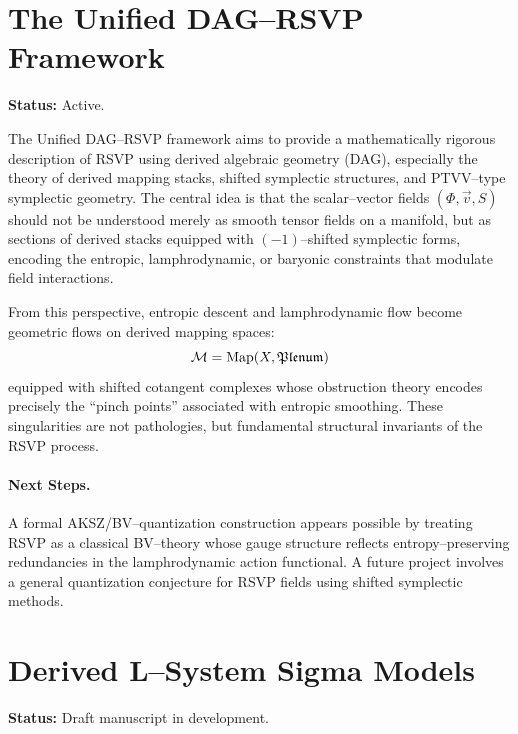 \documentclass[12pt]{article}
\theoremstyle{plain}
\theoremstyle{definition}
\theoremstyle{remark}
\begin{document}
\section{The Unified DAG--RSVP Framework}

\textbf{Status:} Active. 

\medskip

The Unified DAG--RSVP framework aims to provide a mathematically rigorous
description of RSVP using derived algebraic geometry (DAG), especially the theory
of derived mapping stacks, shifted symplectic structures, and PTVV--type 
symplectic geometry. The central idea is that the scalar--vector fields $(\Phi,
\vec{v}, S)$ should not be understood merely as smooth tensor fields on a
manifold, but as sections of derived stacks equipped with $(-1)$--shifted
symplectic forms, encoding the entropic, lamphrodynamic, or baryonic
constraints that modulate field interactions.

From this perspective, entropic descent and lamphrodynamic flow become geometric
flows on derived mapping spaces:
\[
    \mathcal{M} = {\rm Map}(X, \mathfrak{Plenum})
\]
equipped with shifted cotangent complexes whose obstruction theory encodes
precisely the ``pinch points'' associated with entropic smoothing. These
singularities are not pathologies, but fundamental structural invariants of
the RSVP process.

\paragraph{Next Steps.}
A formal AKSZ/BV--quantization construction appears possible by treating RSVP
as a classical BV--theory whose gauge structure reflects entropy--preserving
redundancies in the lamphrodynamic action functional. A future project
involves a general quantization conjecture for RSVP fields using shifted
symplectic methods.


\section{Derived L--System Sigma Models}

\textbf{Status:} Draft manuscript in development.

\medskip
\end{document}

